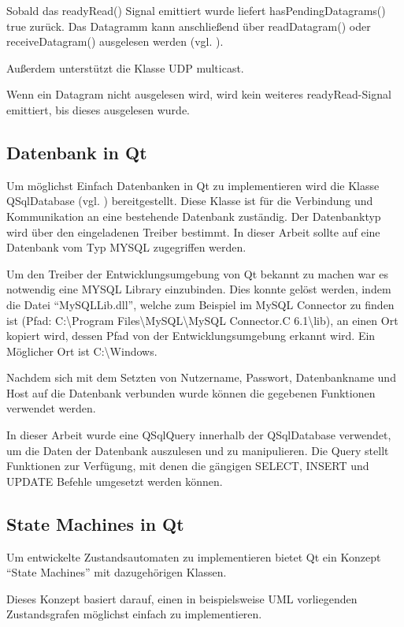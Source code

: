 Sobald das readyRead() Signal emittiert wurde liefert hasPendingDatagrams() true zurück. Das Datagramm kann anschließend über readDatagram() oder receiveDatagram() ausgelesen werden (vgl. \cite{qt_socket}).

Außerdem unterstützt die Klasse UDP multicast.

Wenn ein Datagram nicht ausgelesen wird, wird kein weiteres readyRead-Signal emittiert, bis dieses ausgelesen wurde. 

\subsection{Datenbank in Qt}
\label{sec:QTDatabase}

Um möglichst Einfach Datenbanken in Qt zu implementieren wird die Klasse QSqlDatabase (vgl. \cite{qt_database}) bereitgestellt. Diese Klasse ist für die Verbindung und Kommunikation an eine bestehende Datenbank zuständig. Der Datenbanktyp wird über den eingeladenen Treiber bestimmt. In dieser Arbeit sollte auf eine Datenbank vom Typ MYSQL zugegriffen werden.

Um den Treiber der Entwicklungsumgebung von Qt bekannt zu machen war es notwendig eine MYSQL Library einzubinden. Dies konnte gelöst werden, indem die Datei "`MySQLLib.dll"', welche zum Beispiel im MySQL Connector zu finden ist (Pfad: C:\textbackslash Program Files\textbackslash MySQL\textbackslash MySQL Connector.C 6.1\textbackslash lib), an einen Ort kopiert wird, dessen Pfad von der Entwicklungsumgebung erkannt wird. Ein Möglicher Ort ist C:\textbackslash Windows. 

Nachdem sich mit dem Setzten von Nutzername, Passwort, Datenbankname und Host auf die Datenbank verbunden wurde können die gegebenen Funktionen verwendet werden. 

In dieser Arbeit wurde eine QSqlQuery innerhalb der QSqlDatabase verwendet, um die Daten der Datenbank auszulesen und zu manipulieren. Die Query stellt Funktionen zur Verfügung, mit denen die gängigen SELECT, INSERT und UPDATE Befehle umgesetzt werden können.  

\subsection{State Machines in Qt}
\label{sec:StateMachines}

Um entwickelte Zustandsautomaten zu implementieren bietet Qt ein Konzept "`State Machines"' mit dazugehörigen Klassen. 

Dieses Konzept basiert darauf, einen in beispielsweise UML vorliegenden Zustandsgrafen möglichst einfach zu implementieren. 

